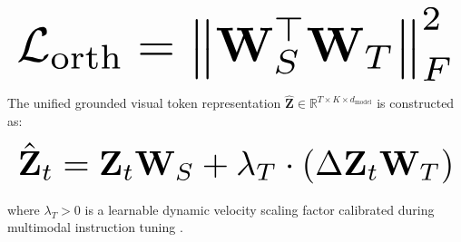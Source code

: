 \documentclass[10pt,journal,compsoc,twocolumn]{IEEEtran}
\begin{document}
\begin{equation}
\resizebox{\columnwidth}{!}{$\displaystyle
\begin{aligned}
\mathcal{L}_{\text{orth}} = \left\| \mathbf{W}_S^\top \mathbf{W}_T \right\|_F^2
\end{aligned}
$}
\end{equation}

























The unified grounded visual token representation $\hat{\mathbf{Z}} \in \mathbb{R}^{T \times K \times d_{\text{model}}}$ is constructed as:

























\begin{equation}
\resizebox{\columnwidth}{!}{$\displaystyle
\begin{aligned}
\hat{\mathbf{Z}}_t = \mathbf{Z}_t \mathbf{W}_S + \lambda_T \cdot \left( \Delta \mathbf{Z}_t \mathbf{W}_T \right)
\end{aligned}
$}
\end{equation}

























where $\lambda_T > 0$ is a learnable dynamic velocity scaling factor calibrated during multimodal instruction tuning \cite{arxiv_2305_18290}.
\end{document}
